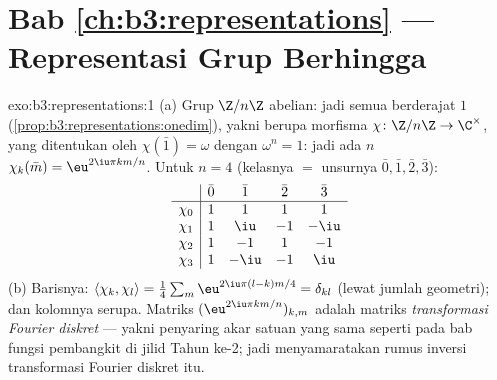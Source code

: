 \section*{Bab \ref{ch:b3:representations} --- Representasi
Grup Berhingga}

\begin{solution}{exo:b3:representations:1}
(a) Grup $\Z/n\Z$ abelian: jadi semua  berderajat $1$
(\cref{prop:b3:representations:onedim}), yakni berupa morfisma
$\chi \colon \Z/n\Z \to \C^\times$, yang ditentukan oleh $\chi(\bar 1)
= \omega$ dengan $\omega^n = 1$: jadi ada $n$  $\chi_k(\bar
m) = \eu^{2\iu\pi km/n}$. Untuk $n = 4$ (kelasnya $=$ unsurnya
$\bar0,\bar1,\bar2,\bar3$):
\[
\begin{array}{c|cccc}
& \bar0 & \bar1 & \bar2 & \bar3\\
\hline
\chi_0 & 1 & 1 & 1 & 1\\
\chi_1 & 1 & \iu & -1 & -\iu\\
\chi_2 & 1 & -1 & 1 & -1\\
\chi_3 & 1 & -\iu & -1 & \iu
\end{array}
\]
(b) Barisnya: $\langle\chi_k,\chi_l\rangle = \frac14\sum_m
\eu^{2\iu\pi(l-k)m/4} = \delta_{kl}$ (lewat jumlah geometri); dan kolomnya
serupa. Matriks $(\eu^{2\iu\pi km/n})_{k,m}$ adalah matriks
\emph{transformasi Fourier diskret} --- yakni penyaring
akar satuan yang sama seperti pada bab fungsi pembangkit di
jilid Tahun ke-2; jadi 
menyamaratakan rumus inversi transformasi Fourier diskret itu.
\end{solution}

